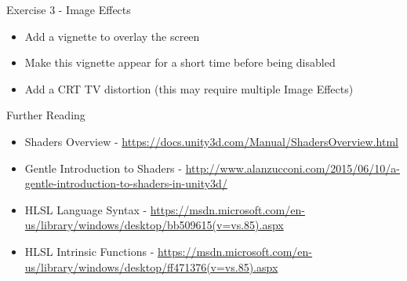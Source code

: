 \begin{frame}{Exercise 3 - Image Effects}
\begin{itemize}
	\item Add a vignette to overlay the screen
	\item Make this vignette appear for a short time before being disabled
	\item Add a CRT TV distortion (this may require multiple Image Effects)
\end{itemize}
\end{frame}

\begin{frame}{Further Reading}
	\begin{itemize}
		\item Shaders Overview - \url{https://docs.unity3d.com/Manual/ShadersOverview.html}
		\item Gentle Introduction to Shaders - \url{http://www.alanzucconi.com/2015/06/10/a-gentle-introduction-to-shaders-in-unity3d/}
		\item HLSL Language Syntax - \url{https://msdn.microsoft.com/en-us/library/windows/desktop/bb509615(v=vs.85).aspx}
		\item HLSL Intrinsic Functions - \url{https://msdn.microsoft.com/en-us/library/windows/desktop/ff471376(v=vs.85).aspx} 
	\end{itemize}
\end{frame}
